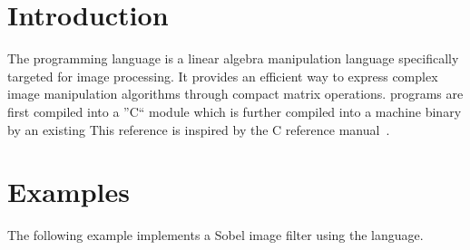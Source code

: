 \newcommand{\startsyn}{\begin{center}\begin{tabular}{l}}
\newcommand{\stopsyn}{\end{tabular}\end{center}}

\section{Introduction}
The \sys{} programming language is a linear algebra manipulation language
specifically targeted for image processing. It provides an efficient way to
express complex image manipulation algorithms through compact matrix
operations. \sys{} programs are first compiled into a ''C`` module which is
further compiled into a machine binary by an existing 
This reference is inspired by the C reference manual~\cite{DBLP:KernighanR88}.









\section{Examples}
The following example implements a Sobel image filter using the
\sys{} language.

